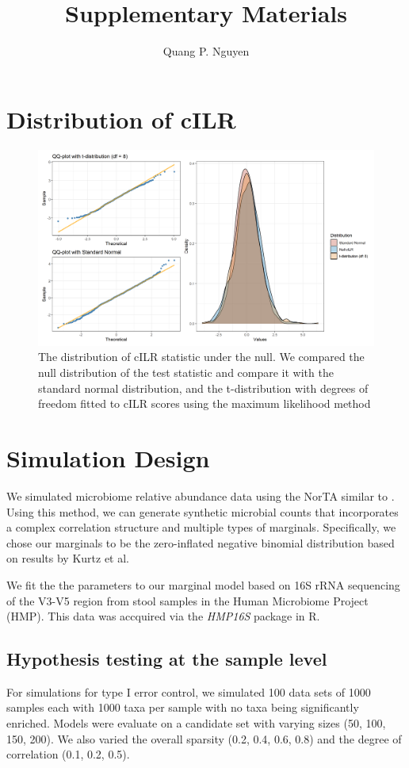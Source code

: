 \documentclass{article}
\author{Quang P. Nguyen}
\title{Supplementary Materials}
\begin{document}
\maketitle

\section{Distribution of cILR}
\begin{figure}[h]
    \centering
    \includegraphics[width=0.8\linewidth]{figures/null_distribution.png}
    \caption{The distribution of cILR statistic under the null. We compared the null distribution of the test statistic and compare it with the standard normal distribution, and the t-distribution with degrees of freedom fitted to cILR scores using the maximum likelihood method}
\end{figure}

\section{Simulation Design}
We simulated microbiome relative abundance data using the NorTA similar to \cite{cario}. Using this method, we can generate synthetic microbial counts that incorporates a complex correlation structure and multiple types of marginals. Specifically, we chose our marginals to be the zero-inflated negative binomial distribution based on results by Kurtz et al.\cite{kurtz2015}

\noindent We fit the the parameters to our marginal model based on 16S rRNA sequencing of the V3-V5 region from stool samples in the Human Microbiome Project (HMP). This data was accquired via the \emph{HMP16S} package in R\cite{schiffer2019}.  

\subsection{Hypothesis testing at the sample level}
\noindent For simulations for type I error control, we simulated 100 data sets of 1000 samples each with 1000 taxa per sample with no taxa being significantly enriched. Models were evaluate on a candidate set with varying sizes (50, 100, 150, 200). We also varied the overall sparsity (0.2, 0.4, 0.6, 0.8) and the degree of correlation (0.1, 0.2, 0.5). \\
\end{document}
